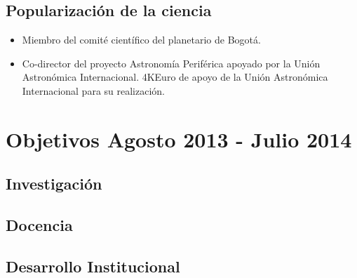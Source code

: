 \documentclass{article}
\begin{document}
\subsection*{Popularizaci\'on de la ciencia}
\begin{itemize}
\item {Miembro del comit\'e cient\'ifico del planetario de Bogot\'a.}
\item {Co-director del proyecto Astronom\'ia Perif\'erica apoyado por
  la Uni\'on Astron\'omica Internacional. 4KEuro de apoyo de la Uni\'on Astron\'omica Internacional para su realizaci\'on.}
\end{itemize}


\section*{Objetivos Agosto 2013 - Julio 2014}
\subsection*{Investigaci\'on}
\subsection*{Docencia}
\subsection*{Desarrollo Institucional}
\end{document}
